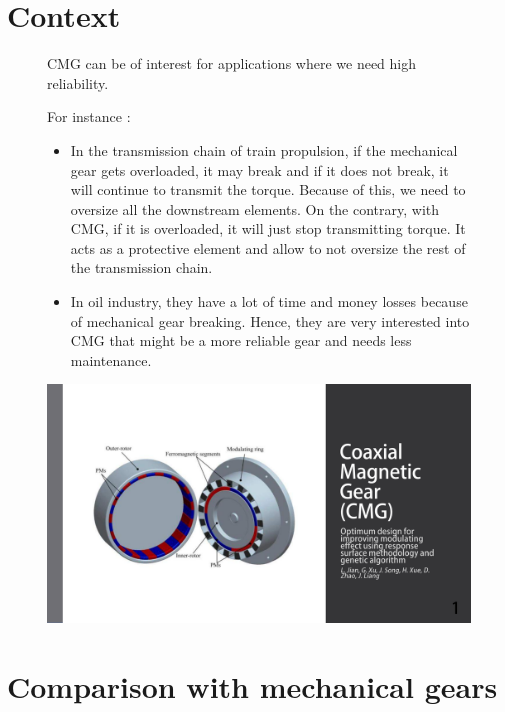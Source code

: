 \section{Context}
\begin{figure}[H]
\begin{minipage}{0.45\linewidth}
CMG can be of interest for applications where we need high reliability.

For instance : 
\begin{itemize}
    \item In the transmission chain of train propulsion, if the mechanical gear gets overloaded, it may break and if it does not break, it will continue to transmit the torque. Because of this, we need to oversize all the downstream elements. On the contrary, with CMG, if it is overloaded, it will just stop transmitting torque. It acts as a protective element and allow to not oversize the rest of the transmission chain.
    \item In oil industry, they have a lot of time and money losses because of mechanical gear breaking. Hence, they are very interested into CMG that might be a more reliable gear and needs less maintenance.
\end{itemize}
\end{minipage}
\hfill
\begin{minipage}[c]{0.45\linewidth}
\centering
\includegraphics[page={2},width=\textwidth]{LELEC2311.allow.pdf}
\label{fig:slide2}
\end{minipage}
\end{figure}

\section{Comparison with mechanical gears}

